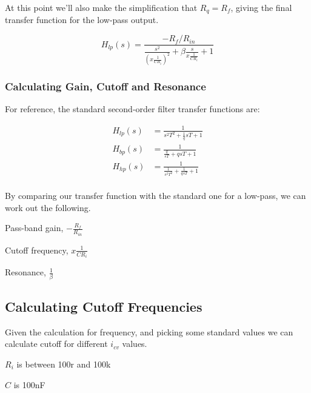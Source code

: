 \documentclass{article}
\begin{document}
At this point we'll also make the simplification that $R_q = R_{f}$, giving the final transfer function for the low-pass output.

\begin{equation}
  H_{lp}(s) = \frac{-R_{f}/R_{in}}{\frac{s^2}{{(x\frac{1}{CR_{i}})}^2} + \beta\frac{s}{x\frac{1}{CR_{i}}} + 1 }
\end{equation}

\subsubsection{Calculating Gain, Cutoff and Resonance}

For reference, the standard second-order filter transfer functions are:

\begin{equation*}
\begin{split}
  H_{lp}(s) & = \frac{1}{s^2T^2 + \frac{1}{q}sT + 1} \\
  H_{bp}(s) & = \frac{1}{\frac{q}{sT} + qsT + 1} \\
  H_{hp}(s) & = \frac{1}{\frac{1}{s^2T^2} + \frac{1}{qsT} + 1} \\
\end{split}
\end{equation*}

By comparing our transfer function with the standard one for a low-pass, we can work out the following.

\begin{description}
  \item Pass-band gain, $-\frac{R_{f}}{R_{in}}$
  \item Cutoff frequency, $x\frac{1}{CR_{i}}$
  \item Resonance, $\frac{1}{\beta}$
\end{description}

\subsection{Calculating Cutoff Frequencies}

Given the calculation for frequency, and picking some standard values we can calculate cutoff for different $i_{cv}$ values.

\begin{description}
  \item $R_i$ is between 100r and 100k
  \item $C$ is 100nF
\end{description}
\end{document}
